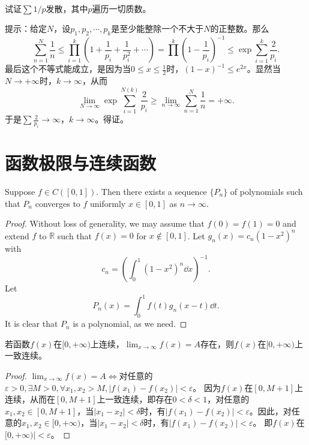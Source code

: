 \begin{example}
\hfill\\
试证$\sum1/p$发散，其中$p$遍历一切质数。

提示：给定$N$，设$p_1,p_2,\cdots,p_k$是至少能整除一个不大于$N$的正整数。那么$$\sum_{n=1}^N\frac{1}{n}\leq\prod_{i=1}^k(1+\frac{1}{p_i}+\frac{1}{p_i^2}+\cdots)=\prod^k(1-\frac{1}{p_i})^{-1}\leq\exp\sum_{i=1}^k\frac{2}{p_i}.$$
最后这个不等式能成立，是因为当$0\leq x\leq \frac{1}{2}$时，$(1-x)^{-1}\leq e^{2x}$。显然当$N\rightarrow+\infty$时，$k\to\infty$，从而
$$\lim_{N\to\infty}\exp\sum_{i=1}^{N(k)}\frac{2}{p_i}\geq\lim_{n\to\infty}\sum_{n=1}^N\frac{1}{n}=+\infty.$$
于是$\sum\frac{2}{p_i}\to\infty$，$k\to\infty$。得证。
\end{example}

 \section{函数极限与连续函数}

\begin{theorem}
  Suppose $f\in C([0,1])$. Then there exists a sequence $\{P_n\}$ of polynomials such that 
  $P_n$ converges to $f$ uniformly $x\in[0,1]$ as $n\to\infty$.  
\end{theorem}

\begin{proof}
  Without loss of generality, we may assume that $f(0) = f(1) = 0$ and extend $f$ to $\mathbb{R}$ such that 
  $f(x)=0$ for $x\not\in[0,1]$.
  Let $g_n(x) = c_n(1-x^2)^n$ with 
  \[
  c_n = \left(\int_0^1(1-x^2)^n\dd x\right)^{-1}.
  \]
  Let 
  \[
  P_n(x) = \int_0^1f(t)g_n(x-t)\dd t.
  \]
  It is clear that $P_n$ is a polynomial, as we need.
\end{proof}

 \begin{example}
  若函数$f(x)$在$[0,+\infty)$上连续，$\displaystyle\lim_{x\rightarrow\infty}f(x)=A$存在，则$f(x)$在$[0,+\infty)$上一致连续。%
 \end{example}

 \begin{proof}
  $\lim_{x\rightarrow\infty}f(x)=A\Leftrightarrow$对任意的$\varepsilon>0,\exists M>0,\forall x_1,x_2>M,|f(x_1)-f(x_2)|<\varepsilon$。
  因为$f(x)$在$[0,M+1]$上连续，从而在$[0,M+1]$上一致连续，即存在$0<\delta<1$，对任意的$x_1,x_2\in[0,M+1]$，当$|x_1-x_2|<\delta$时，有$|f(x_1)-f(x_2)|<\varepsilon$。因此，对任意的$x_1,x_2\in[0,+\infty)$，当$|x_1-x_2|<\delta$时，有$|f(x_1)-f(x_2)|<\varepsilon$。
  即$f(x)$在$[0,+\infty)|<\varepsilon$。
  \end{proof}


